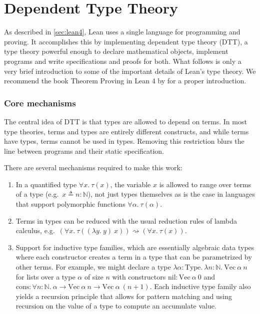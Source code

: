 \section{Dependent Type Theory}\label{sec:dtt}
As described in \cref{sec:lean4}, Lean uses a single language for programming and proving. It accomplishes this by implementing dependent type theory (DTT), a type theory powerful enough to declare mathematical objects, implement programs and write specifications and proofs for both. What follows is only a very brief introduction to some of the important details of Lean's type theory. We recommend the book Theorem Proving in Lean 4 by \cite{avigad_theorem_2022} for a proper introduction.

\subsubsection{Core mechanisms}
The central idea of DTT is that types are allowed to depend on terms. In most type theories, terms and types are entirely different constructs, and while terms have types, terms cannot be used in types. Removing this restriction blurs the line between programs and their static specification.

There are several mechanisms required to make this work: 
\begin{enumerate}
	\item In a quantified type $\forall x.\ \tau(x)$, the variable $x$ is allowed to range over terms of a type (e.g.\ $x \triangleq n : \mathbb{N}$), not just types themselves as is the case in languages that support polymorphic functions $\forall \alpha.\ \tau(\alpha)$.
	\item Terms in types can be reduced with the usual reduction rules of lambda calculus, e.g.\ $(\forall x.\ \tau((\lambda y.\ y)\ x)) \rightsquigarrow (\forall x.\ \tau(x))$.
	\item Support for inductive type families, which are essentially algebraic data types where each constructor creates a term in a type that can be parametrized by other terms. For example, we might declare a type $\lambda \alpha : \mathrm{Type}.\ \lambda n : \mathbb{N}.\ \mathrm{Vec}\ \alpha\ n$ for lists over a type $\alpha$ of size $n$ with constructors $\mathrm{nil} : \mathrm{Vec}\ \alpha\ 0$ and $\mathrm{cons} : \forall n : \mathbb{N}.\ \alpha \to \mathrm{Vec}\ \alpha\ n \to \mathrm{Vec}\ \alpha\ (n+1)$. Each inductive type family also yields a recursion principle that allows for pattern matching and using recursion on the value of a type to compute an accumulate value.
\end{enumerate}

